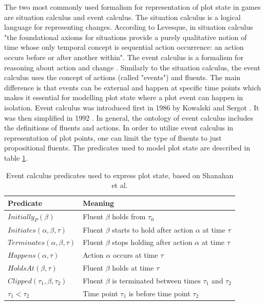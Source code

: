 The two most commonly used formalism for representation of plot state in games are situation calculus and event calculus.
The situation calculus is a logical language for representing changes\cite{lin2008situation}.
According to Levesque, in situation calculus "the foundational axioms for situations provide a purely qualitative notion of time whose only temporal concept is sequential action occurrence: an action occurs before or after another within"\cite{levesque1998foundations}.
The event calculus is a formalism for reasoning about action and change \cite{mueller2008event}.
Similarly to the situation calculus, the event calculus uses the concept of actions (called "events") and fluents.
The main difference is that events can be external and happen at specific time points which makes it essential for modelling plot state where a plot event can happen in isolation.
Event calculus was introduced first in 1986 by Kowalski and Sergot \cite{kowalski1986logic}.
It was then simplified in 1992 \cite{kakas1992abductive}.
In general, the ontology of event calculus includes the definitions of fluents and actions.
In order to utilize event calculus in representation of plot points, one can limit the type of fluents to just propositional fluents.
The predicates used to model plot state are described in table \ref{tab:event-calculus-predicates}.

\begin{table}[]
    \centering
    \begin{tabular}{@{}ll@{}}
        \toprule
        Predicate                                       & Meaning                                                            \\ \midrule
        $Initially_P \left( \beta \right)$              & Fluent $\beta$ holds from $\tau_0$                                 \\
        $Initiates \left( \alpha, \beta, \tau \right)$  & Fluent $\beta$ starts to hold after action $\alpha$ at time $\tau$ \\
        $Terminates \left( \alpha, \beta, \tau \right)$ & Fluent $\beta$ stops holding after action $\alpha$ at time $\tau$  \\
        $Happens \left( \alpha, \tau \right)$           & Action $\alpha$ occurs at time $\tau$                              \\
        $HoldsAt \left( \beta, \tau \right)$            & Fluent $\beta$ holds at time $\tau$                                \\
        $Clipped \left( \tau_1, \beta, \tau_2 \right)$  & Fluent $\beta$ is terminated between times $\tau_1$ and $\tau_2$   \\
        $\tau_1 < \tau_2$                               & Time point $\tau_1$ is before time point $\tau_2$                  \\ \bottomrule
    \end{tabular}
    \caption{Event calculus predicates used to express plot state, based on Shanahan et al.\cite{shanahan2001event}}
    \label{tab:event-calculus-predicates}
\end{table}

